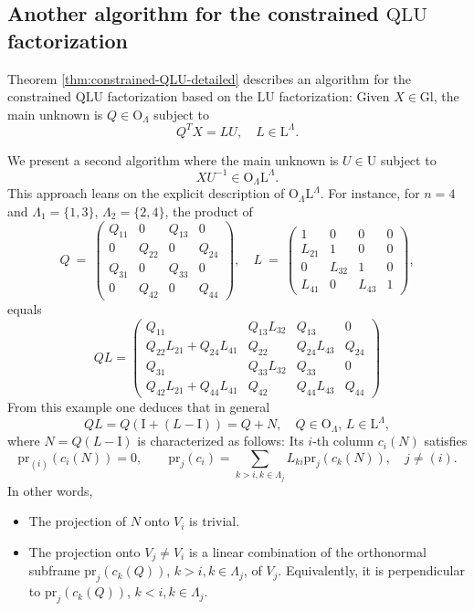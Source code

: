 \documentclass[reqno]{amsart}
\newcommand{\pr}{\mathrm{pr}}
\newcommand{\Gl}{\mathrm{Gl}}
\renewcommand{\L}{\mathrm{L}}
\newcommand{\U}{\mathrm{U}}
\theoremstyle{definition} %
\begin{document}
\subsection{Another algorithm for the constrained $\mathrm{Q}\L\U$ factorization}
Theorem \ref{thm:constrained-QLU-detailed} describes an algorithm for the constrained $\mathrm{Q}\L\U$ factorization based on the $\L\U$ factorization: Given $X\in \Gl$, the main unknown is  $Q\in \mathrm{O}_\Lambda$ subject to
\[Q^TX=LU,\quad L\in \L^\Lambda.\]

We present a second algorithm where the main unknown is $U\in \U$ subject to
\begin{equation}\label{eq:algorithm-2}
XU^{-1}\in \mathrm{O}_\Lambda \L^\Lambda.
 \end{equation}
This approach leans on the explicit description of $\mathrm{O}_\Lambda \L^\Lambda$. For instance, for $n=4$ and $\Lambda_1=\{1,3\}$, $\Lambda_2=\{2,4\}$, the product of
					\[ Q \ = \ \begin{pmatrix} Q_{11}& 0 & Q_{13}& 0\\ 0& Q_{22}& 0& Q_{24}\\ Q_{31}& 0& Q_{33}& 0\\ 0& Q_{42}& 0& Q_{44} \end{pmatrix}, \quad  L \ = \  \begin{pmatrix} 1& 0& 0& 0\\ L_{21}& 1& 0& 0\\ 0& L_{32}& 1& 0\\ L_{41}& 0& L_{43} & 1\end{pmatrix}, \]equals  \[QL=\begin{pmatrix}
						Q_{11} & Q_{13} L_{32}& Q_{13} & 0\\
						Q_{22} L_{21}+Q_{24} L_{41}  & Q_{22}  & Q_{24} L_{43}  & Q_{24}\\
						Q_{3 1}  & Q_{3 3}L_{32}  & Q_{3 3}  & 0\\
						Q_{4 2} L_{21}+Q_{4 4} L_{41}  & Q_{4 2}  & Q_{4 4} L_{43}  & Q_{4 4} \end{pmatrix}  \]
From this example one deduces that in general
\[QL=Q(\mathrm{I}+(L-\mathrm{I}))=Q+N,\quad Q\in\mathrm{O}_\Lambda,\,L\in \L^\Lambda,\]
where $N=Q(L-\mathrm{I})$ is characterized as follows: Its $i$-th column $c_i(N)$
satisfies
\[\pr_{(i)}(c_i(N))=0,\qquad \pr_{j}(c_i)=\sum_{k>i,k\in \Lambda_j}L_{ki}\pr_{j}(c_k(N)),\quad j\neq (i).\]
In other words,
\begin{itemize}
 \item  The projection of $N$ onto $V_i$ is trivial.
 \item The projection onto $V_j\neq V_i$  is a linear combination of the orthonormal subframe $\pr_j(c_k(Q))$, $k>i,k\in \Lambda_j$, of $V_j$. Equivalently, it is perpendicular to  $\pr_j(c_k(Q))$, $k<i,k\in \Lambda_j$.
\end{itemize}
\end{document}
